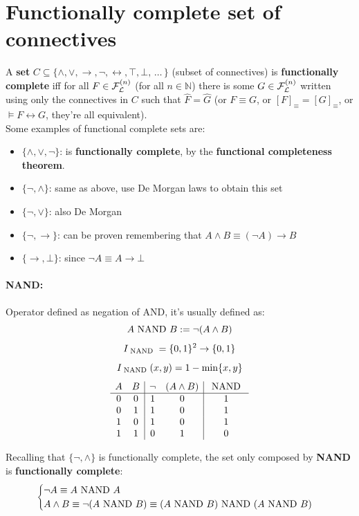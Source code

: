 	\section{Functionally complete set of connectives}

	A \textbf{set} $C \subseteq \{\wedge, \vee, \rightarrow, \neg, \leftrightarrow, \top, \bot, \, \dots \, \}$ (subset of connectives) is \textbf{functionally complete} iff for all $F \in \mathcal{F}_\mathcal{L}^{(n)}$ (for all $n \in \mathbb{N}$) there is some $G \in \mathcal{F}_\mathcal{L}^{(n)}$ written using only the connectives in $C$ such that $\hat F = \hat G$ (or $F \equiv G$, or $[F]_\equiv = [G]_\equiv$, or $\models F \leftrightarrow G$, they're all equivalent). \\

	\noindent
	Some examples of functional complete sets are:
	\vspace{-0.2cm}
	\begin{itemize}
		\item $\{\wedge, \vee, \neg \}$: is \textbf{functionally complete}, by the \textbf{functional completeness theorem}.
		\item $\{\neg, \wedge\}$: same as above, use De Morgan laws to obtain this set
		\item $\{\neg, \vee\}$: also De Morgan
		\item $\{\neg, \rightarrow\}$: can be proven remembering that $A \wedge B \equiv (\neg A) \rightarrow B$
		\item $\{\rightarrow, \bot\}$: since $\neg A \equiv A \rightarrow \bot$
	\end{itemize}

	\paragraph{NAND:} Operator defined as negation of AND, it's usually defined as:
	$$ A \text{ NAND } B := \neg (A \wedge B) $$
	$$ I_{\text{ NAND }} = \{0,1\}^2 \rightarrow \{0,1\} $$
	$$ I_{\text{ NAND }} (x,y) = 1 - \min\{x,y\}$$
	$$
	\begin{array}{c c | c c | c}
		A & B & \neg & (A \wedge B) & \text{ NAND } \\
		\hline
		0 & 0 & 1 & 0 & 1 \\
		0 & 1 & 1 & 0 & 1 \\
		1 & 0 & 1 & 0 & 1 \\
		1 & 1 & 0 & 1 & 0 \\
	\end{array}
	$$


	\noindent
	Recalling that $\{\neg, \wedge\}$ is functionally complete, the set only composed by \textbf{NAND} is \textbf{functionally complete}:
	$$
	\begin{cases}
		\neg A \equiv A \text{ NAND } A \\
		A \wedge B \equiv \neg (A \text{ NAND } B) \equiv (A \text{ NAND } B) \text{ NAND } (A \text{ NAND } B)
	\end{cases}
	$$

